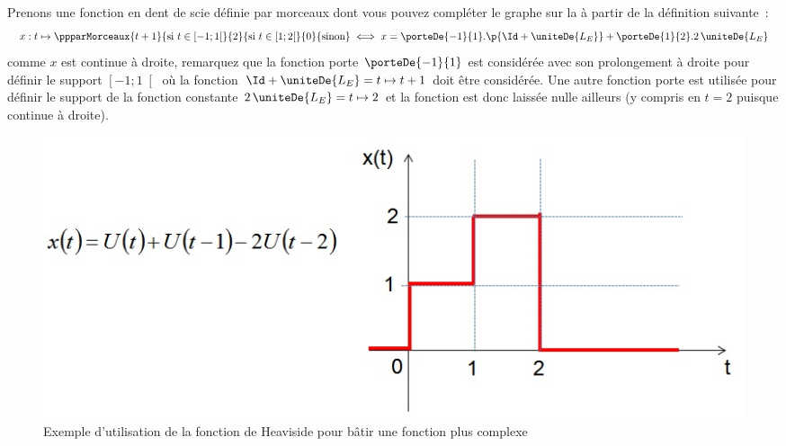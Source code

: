      \begin{exemple}
        Prenons une fonction en dent de scie définie par morceaux dont
        vous pouvez compléter le graphe sur la
         à partir de la définition
        suivante~:
        \begin{equation*}
         x : t \mapsto \ppparMorceaux
          {t+1}{\text{si } t\in\left[-1 ; 1\right[}
          {2}{\text{si }t\in\left[1 ; 2\right[}
          {0}{\text{sinon}}
          \iff x = \porteDe{-1}{1}.\p{\Id+\uniteDe{L_E}}+\porteDe{1}{2}.2\,\uniteDe{L_E}
        \end{equation*}
        comme $x$ est continue à droite, remarquez que la fonction
        porte $\porteDe{-1}{1}$ est considérée avec son prolongement à
        droite pour définir le support $\left[-1 ; 1\right[$ où la
        fonction $\Id+\uniteDe{L_E}=t\mapsto t+1$ doit être
        considérée. Une autre fonction porte est utilisée pour définir
        le support de la fonction constante
        $2\,\uniteDe{L_E}=t\mapsto 2$ et la fonction est donc laissée
        nulle ailleurs (y compris en $t=2$ puisque continue à droite).
        \begin{figure}[htbp]
          \centering
          \includegraphics[scale=0.5]{images/Utilisation_Heaviside.jpg}
          \caption{Exemple d'utilisation de la fonction de Heaviside
            pour bâtir une fonction plus complexe}
          \label{fig:approx_escalier}
	\end{figure}


\end{exemple}
